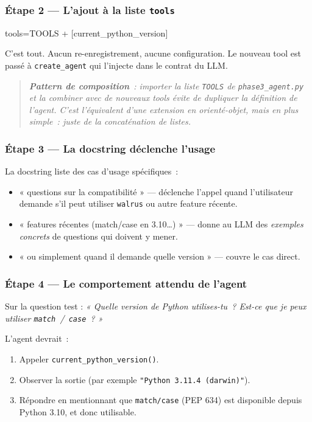 \documentclass[11pt,a4paper]{article}
\begin{document}
\subsubsection*{Étape 2 — L'ajout à la liste \texttt{tools}}

\begin{pythoncode}
tools=TOOLS + [current_python_version]
\end{pythoncode}

C'est tout. Aucun re-enregistrement, aucune configuration. Le nouveau
tool est passé à \texttt{create\_agent} qui l'injecte dans le contrat
du LLM.

\begin{quote}\itshape
\textbf{Pattern de composition}~: importer la liste \texttt{TOOLS} de
\texttt{phase3\_agent.py} et la combiner avec de nouveaux tools évite
de dupliquer la définition de l'agent. C'est l'équivalent d'une
\emph{extension} en orienté-objet, mais en plus simple~: juste de la
concaténation de listes.
\end{quote}

\subsubsection*{Étape 3 — La docstring déclenche l'usage}

La docstring liste des cas d'usage spécifiques~:
\begin{itemize}[leftmargin=*]
  \item « questions sur la compatibilité » — déclenche l'appel quand
        l'utilisateur demande s'il peut utiliser \texttt{walrus} ou autre
        feature récente.
  \item « features récentes (match/case en 3.10\dots) » — donne au LLM
        des \emph{exemples concrets} de questions qui doivent y mener.
  \item « ou simplement quand il demande quelle version » — couvre le
        cas direct.
\end{itemize}

\subsubsection*{Étape 4 — Le comportement attendu de l'agent}

Sur la question test :
\emph{« Quelle version de Python utilises-tu~? Est-ce que je peux
utiliser \texttt{match}~/~\texttt{case}~? »}

L'agent devrait~:
\begin{enumerate}[leftmargin=*]
  \item Appeler \texttt{current\_python\_version()}.
  \item Observer la sortie (par exemple \texttt{"Python 3.11.4 (darwin)"}).
  \item Répondre en mentionnant que \texttt{match/case} (PEP 634) est
        disponible depuis Python 3.10, et donc utilisable.
\end{enumerate}
\end{document}
